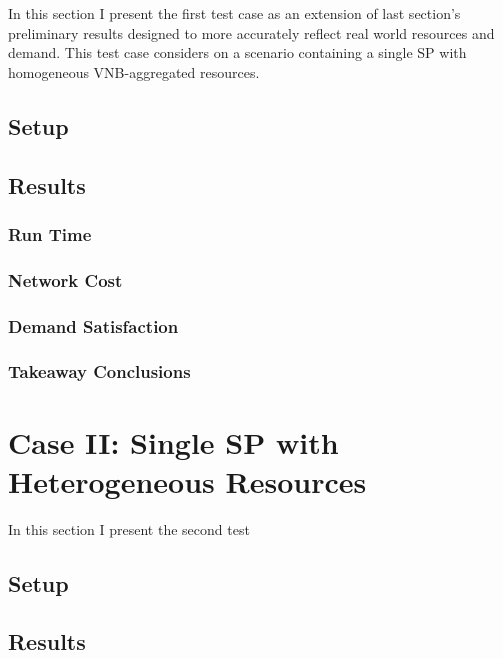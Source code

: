\documentclass[12pt,dvipsnames]{report}
\begin{document}
In this section I present the first test case as an extension of last section's preliminary results designed to more accurately reflect real world resources and demand.  This test case considers on a scenario containing a single SP with homogeneous VNB-aggregated resources.

\subsection{Setup} \label{subsec:caseI_setup}

\subsection{Results} \label{subsec:caseI_results}

\subsubsection{Run Time}

\subsubsection{Network Cost}

\subsubsection{Demand Satisfaction}

\subsubsection{Takeaway Conclusions}

\section{Case II: Single SP with Heterogeneous Resources} \label{sec:caseII}

In this section I present the second test

\subsection{Setup} \label{subsec:caseII_setup}

\subsection{Results} \label{subsec:caseII_results}
\end{document}
